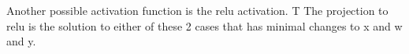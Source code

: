 Another possible activation function is the relu activation.
T
The projection to relu is the solution to either of these 2 cases that has minimal changes to x and w and y.


